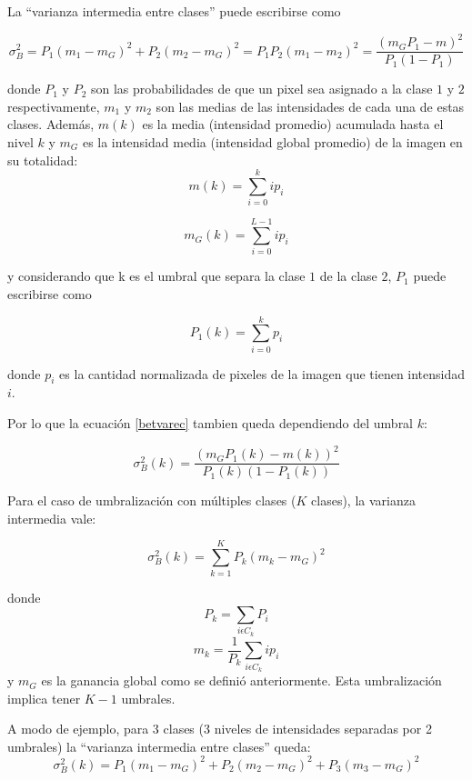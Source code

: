 La ``varianza intermedia entre clases'' puede escribirse como

\begin{equation}
{\sigma}_B^2 = P_1(m_1-m_G)^2 + P_2(m_2-m_G)^2 = P_1P_2(m_1-m_2)^2 = \frac{(m_GP_1 - m)^2}{P_1(1-P_1)}
\label{betvarec}
\end{equation}

donde $P_1$ y $P_2$ son las probabilidades de que un pixel sea asignado a la clase $1$ y $2$ respectivamente, $m_1$ y $m_2$ son las medias de las intensidades de cada una de estas clases. Además, $m(k)$ es la media (intensidad promedio) acumulada  hasta el nivel $k$ y $m_G$ es la intensidad media (intensidad global promedio) de la imagen en su totalidad:
\begin{equation}
m(k) = \sum_{i=0}^{k}ip_i
\label{mediacumulativa}
\end{equation}

\begin{equation}
m_G(k) = \sum_{i=0}^{L-1}ip_i
\label{mediaglobal}
\end{equation}

y considerando que k es el umbral que separa la clase $1$ de la clase $2$, $P_1$ puede escribirse como

\begin{equation}
 P_1(k) = \sum_{i=0}^kp_i 
 \label{peuno}
\end{equation}

donde $p_i$ es la cantidad normalizada de pixeles de la imagen que tienen intensidad $i$.

Por lo que la ecuación \ref{betvarec} tambien queda dependiendo del umbral $k$:

\begin{equation}
{\sigma}_B^2(k) = \frac{(m_GP_1(k) - m(k))^2}{P_1(k)(1-P_1(k))}
\label{betvarec2}
\end{equation}

Para el caso de umbralización con múltiples clases ($K$ clases), la varianza intermedia vale:

\begin{equation}
  {\sigma}_B^2(k) = \sum_{k=1}^{K}P_k(m_k-m_G)^2
  \label{betvarec3}
\end{equation}

donde $$P_k=\sum_{i{\epsilon}C_k}P_i$$ $$m_k = \frac{1}{P_k}\sum_{i{\epsilon}C_k}ip_i$$ y $m_G$ es la ganancia global como se definió anteriormente. Esta umbralización implica tener $K-1$ umbrales.

A modo de ejemplo, para 3 clases (3 niveles de intensidades separadas por 2 umbrales) la ``varianza intermedia entre clases'' queda:
\begin{equation}
  {\sigma}_B^2(k) = P_1(m_1 - m_G)^2 + P_2(m_2 - m_G)^2 + P_3(m_3 - m_G)^2
\end{equation}

